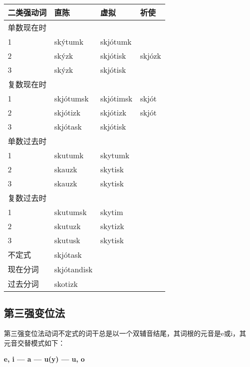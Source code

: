 \begin{longtable}{llll}
    \toprule
    二类强动词 & 直陈          & 虚拟        & 祈使     \\
    \midrule
    \endhead
    \bottomrule
    \endfoot
    单数现在时 &             &           &        \\
    1     & skýtumk     & skjótumk  &        \\
    2     & skýzk       & skjótisk  & skjózk \\
    3     & skýzk       & skjótisk  &        \\
    复数现在时 &             &           &        \\
    1     & skjótumsk   & skjótimsk & skjót  \\
    2     & skjótizk    & skjótizk  & skjót  \\
    3     & skjótask    & skjótisk  &        \\
    单数过去时 &             &           &        \\
    1     & skutumk     & skytumk   &        \\
    2     & skauzk      & skytisk   &        \\
    3     & skauzk      & skytisk   &        \\
    复数过去时 &             &           &        \\
    1     & skutumsk    & skytim    &        \\
    2     & skutuzk     & skytizk   &        \\
    3     & skutusk     & skytisk   &        \\
    不定式   & skjótask    &           &        \\
    现在分词  & skjótandisk &           &        \\
    过去分词  & skotizk     &           &        \\
\end{longtable}

\subsection{第三强变位法}\label{第三强变位法}

第三强变位法动词不定式的词干总是以一个双辅音结尾，其词根的元音是e或i，其元音交替模式如下：

\begin{center}
    \textbf{e, i --- a --- u(y) --- u, o}
\end{center}


